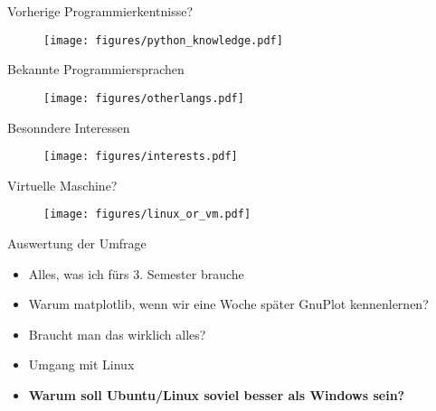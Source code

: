 \begin{frame}{Vorherige Programmierkentnisse?}
    \begin{figure}
        \centering
        \texttt{[image: figures/python\_knowledge.pdf]}
    \end{figure}
\end{frame}
\begin{frame}{Bekannte Programmiersprachen}
    \begin{figure}
        \centering
        \texttt{[image: figures/otherlangs.pdf]}
    \end{figure}
\end{frame}
\begin{frame}{Besonndere Interessen}
    \begin{figure}
        \centering
        \texttt{[image: figures/interests.pdf]}
    \end{figure}
\end{frame}
\begin{frame}{Virtuelle Maschine?}
    \begin{figure}
        \centering
        \texttt{[image: figures/linux\_or\_vm.pdf]}
    \end{figure}
\end{frame}
\begin{frame}{Auswertung der Umfrage}
    \begin{itemize}
        \item Alles, was ich fürs 3. Semester brauche
        \item Warum matplotlib, wenn wir eine Woche später GnuPlot kennenlernen?
        \item Braucht man das wirklich alles?
        \item Umgang mit Linux
        \item \textbf{Warum soll Ubuntu/Linux soviel besser als Windows sein?}
    \end{itemize}
\end{frame}
